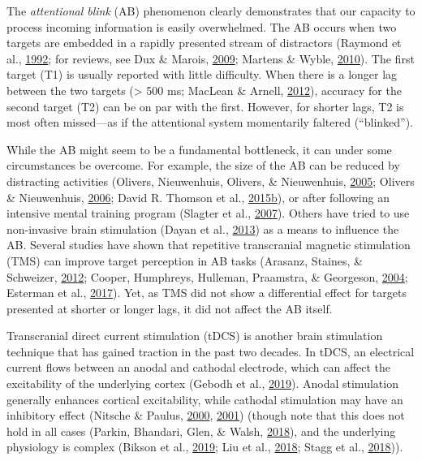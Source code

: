 \documentclass[11pt,]{memoir}
\begin{document}
The \emph{attentional blink} (AB) phenomenon clearly demonstrates that our capacity to process incoming information is easily overwhelmed. The AB occurs when two targets are embedded in a rapidly presented stream of distractors (Raymond et al., \protect\hyperlink{ref-Raymond1992}{1992}; for reviews, see Dux \& Marois, \protect\hyperlink{ref-Dux2009}{2009}; Martens \& Wyble, \protect\hyperlink{ref-Martens2010}{2010}). The first target (T1) is usually reported with little difficulty. When there is a longer lag between the two targets (\textgreater{} 500 ms; MacLean \& Arnell, \protect\hyperlink{ref-MacLean2012}{2012}), accuracy for the second target (T2) can be on par with the first. However, for shorter lags, T2 is most often missed---as if the attentional system momentarily faltered (``blinked'').

While the AB might seem to be a fundamental bottleneck, it can under some circumstances be overcome. For example, the size of the AB can be reduced by distracting activities (Olivers, Nieuwenhuis, Olivers, \& Nieuwenhuis, \protect\hyperlink{ref-Olivers2005}{2005}; Olivers \& Nieuwenhuis, \protect\hyperlink{ref-Olivers2006}{2006}; David R. Thomson et al., \protect\hyperlink{ref-Thomson2015a}{2015}\protect\hyperlink{ref-Thomson2015a}{b}), or after following an intensive mental training program (Slagter et al., \protect\hyperlink{ref-Slagter2007}{2007}). Others have tried to use non-invasive brain stimulation (Dayan et al., \protect\hyperlink{ref-Dayan2013}{2013}) as a means to influence the AB. Several studies have shown that repetitive transcranial magnetic stimulation (TMS) can improve target perception in AB tasks (Arasanz, Staines, \& Schweizer, \protect\hyperlink{ref-Arasanz2012}{2012}; Cooper, Humphreys, Hulleman, Praamstra, \& Georgeson, \protect\hyperlink{ref-Cooper2004}{2004}; Esterman et al., \protect\hyperlink{ref-Esterman2017}{2017}). Yet, as TMS did not show a differential effect for targets presented at shorter or longer lags, it did not affect the AB itself.

Transcranial direct current stimulation (tDCS) is another brain stimulation technique that has gained traction in the past two decades. In tDCS, an electrical current flows between an anodal and cathodal electrode, which can affect the excitability of the underlying cortex (Gebodh et al., \protect\hyperlink{ref-Gebodh2019a}{2019}). Anodal stimulation generally enhances cortical excitability, while cathodal stimulation may have an inhibitory effect (Nitsche \& Paulus, \protect\hyperlink{ref-Nitsche2000}{2000}, \protect\hyperlink{ref-Nitsche2001}{2001}) (though note that this does not hold in all cases (Parkin, Bhandari, Glen, \& Walsh, \protect\hyperlink{ref-Parkin2018}{2018}), and the underlying physiology is complex (Bikson et al., \protect\hyperlink{ref-Bikson2019}{2019}; Liu et al., \protect\hyperlink{ref-Liu2018}{2018}; Stagg et al., \protect\hyperlink{ref-Stagg2018}{2018})).
\end{document}
